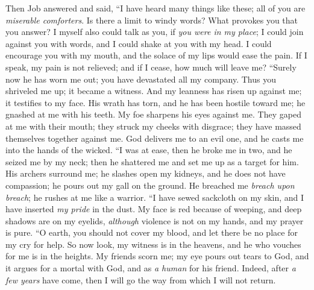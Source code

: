 \begin{biblechapter} %
 Then Job answered and said,
\verse “I have heard many things like these; 
all of you are \textit{miserable comforters}.
\verse Is there a limit to windy words? 
What provokes you that you answer?
\verse I myself also could talk as you, 
if \textit{you were in my place}; 
I could join against you with words, 
and I could shake at you with my head.
\verse I could encourage you with my mouth, 
and the solace of my lips would ease the pain.
\verse If I speak, my pain is not relieved; 
and if I cease, how much will leave me?
\verse “Surely now he has worn me out; 
you have devastated all my company.
\verse Thus you shriveled me up; 
it became a witness. 
And my leanness has risen up against me; 
it testifies to my face.
\verse His wrath has torn, and he has been hostile toward me; 
he gnashed at me with his teeth. 
My foe sharpens his eyes against me.
\verse They gaped at me with their mouth; 
they struck my cheeks with disgrace; 
they have massed themselves together against me.
\verse God delivers me to an evil one, 
and he casts me into the hands of the wicked.
\verse “I was at ease, then he broke me in two, 
and he seized me by my neck; 
then he shattered me 
and set me up as a target for him.
\verse His archers surround me; 
he slashes open my kidneys, and he does not have compassion; 
he pours out my gall on the ground.
\verse He breached me \textit{breach upon breach}; 
he rushes at me like a warrior.
\verse “I have sewed sackcloth on my skin, 
and I have inserted \textit{my pride} in the dust.
\verse My face is red because of weeping, 
and deep shadows are on my eyelids,
\verse \textit{although} violence is not on my hands, 
and my prayer is pure.
\verse “O earth, you should not cover my blood, 
and let there be no place for my cry for help.
\verse So now look, my witness is in the heavens, 
and he who vouches for me is in the heights.
\verse My friends scorn me; 
my eye pours out tears to God,
\verse and it argues for a mortal with God, 
and as \textit{a human} for his friend.
\verse Indeed, after \textit{a few years} have come, 
then I will go the way from which I will not return.
\end{biblechapter}

